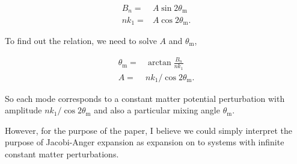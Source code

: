 \documentclass[%
 aip,
rsi,%
 amsmath,amssymb,
preprint,%
]{revtex4-1}
\begin{document}
\begin{align}
B_n = & A\sin 2\theta_{\mathrm m} \\
nk_1 = & A\cos 2\theta_{\mathrm m}.
\end{align}

To find out the relation, we need to solve $A$ and $\theta_{\mathrm m}$,

\begin{align}
\theta_{\mathrm m} =& \arctan \frac{B_n}{n k_1} \\
A =& n k_1 /\cos 2\theta_{\mathrm m}.
\end{align}

So each mode corresponds to a constant matter potential perturbation with amplitude $nk_1/\cos 2\theta_{\mathrm m}$ and also a particular mixing angle $\theta_{\mathrm m}$.

However, for the purpose of the paper, I believe we could simply interpret the purpose of Jacobi-Anger expansion as expansion on to systems with infinite constant matter perturbations.
\end{document}

